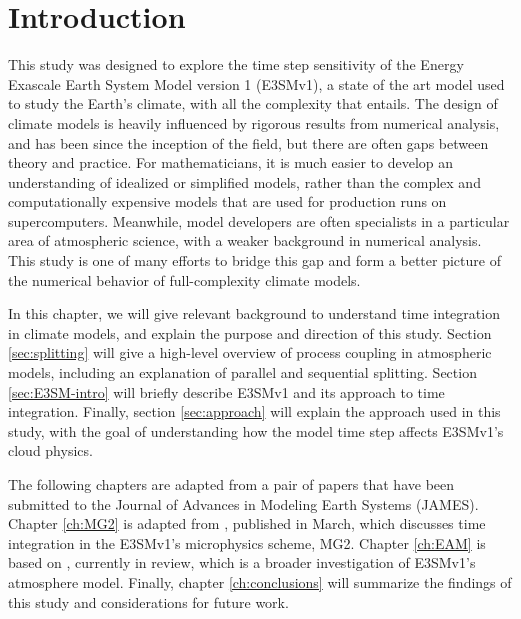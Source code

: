 \documentclass [11pt, proquest] {uwthesis}[2020/02/24]
\begin{document}
 
 
%
%

\textpages
 
 
\chapter{Introduction}

This study was designed to explore the time step sensitivity of the Energy Exascale Earth System Model version 1 (E3SMv1), a state of the art model used to study the Earth's climate, with all the complexity that entails. The design of climate models is heavily influenced by rigorous results from numerical analysis, and has been since the inception of the field, but there are often gaps between theory and practice. For mathematicians, it is much easier to develop an understanding of idealized or simplified models, rather than the complex and computationally expensive models that are used for production runs on supercomputers. Meanwhile, model developers are often specialists in a particular area of atmospheric science, with a weaker background in numerical analysis. This study is one of many efforts to bridge this gap and form a better picture of the numerical behavior of full-complexity climate models.

In this chapter, we will give relevant background to understand time integration in climate models, and explain the purpose and direction of this study. Section \ref{sec:splitting} will give a high-level overview of process coupling in atmospheric models, including an explanation of parallel and sequential splitting. Section \ref{sec:E3SM-intro} will briefly describe E3SMv1 and its approach to time integration. Finally, section \ref{sec:approach} will explain the approach used in this study, with the goal of understanding how the model time step affects E3SMv1's cloud physics.

The following chapters are adapted from a pair of papers that have been submitted to the Journal of Advances in Modeling Earth Systems (JAMES). Chapter \ref{ch:MG2} is adapted from  \textcite{Santos2020}, published in March, which discusses time integration in the E3SMv1's microphysics scheme, MG2. Chapter \ref{ch:EAM} is based on \textcite{Santos2020b}, currently in review, which is a broader investigation of E3SMv1's atmosphere model. Finally, chapter \ref{ch:conclusions} will summarize the findings of this study and considerations for future work.
\end{document}
